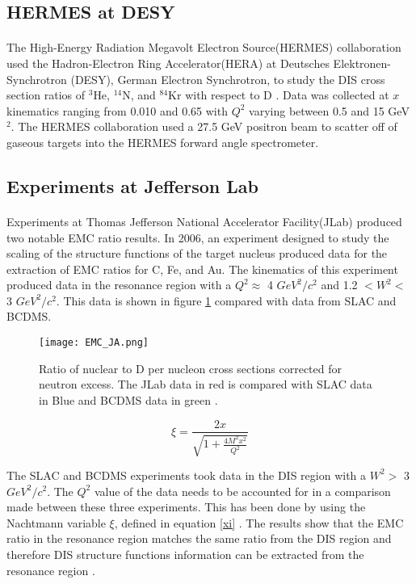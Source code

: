 \subsection{HERMES at DESY}
\paragraph{}
The High-Energy Radiation Megavolt Electron Source(HERMES) collaboration used the Hadron-Electron Ring Accelerator(HERA) at Deutsches Elektronen-Synchrotron (DESY), German Electron Synchrotron, to study the DIS cross section ratios of $^3$He, $^{14}$N, and $^{84}$Kr with respect to D \cite{HERMES_EMC}. Data was collected at $x$ kinematics ranging from 0.010 and 0.65 with $Q^2$ varying between 0.5 and 15 GeV$^2$\cite{HERMES_EMC}. The HERMES collaboration used a 27.5 GeV positron beam to scatter off of gaseous targets into the HERMES forward angle spectrometer. 
\subsection{Experiments at Jefferson Lab}
\paragraph{}Experiments at Thomas Jefferson National Accelerator Facility(JLab) produced two notable EMC ratio results. In 2006, an experiment designed to study the scaling of the structure functions of the target nucleus produced data for the extraction of EMC ratios for C, Fe, and Au. The kinematics of this experiment produced data in the resonance region with a $Q^2 \approx$ 4 $GeV^2/c^2$ and 1.2 $ < W^2 < $ 3 $GeV^2/c^2$. This data is shown in figure \ref{fig:EMCJA} compared with data from SLAC and BCDMS. 
\begin{figure}[]
	\centering
	\texttt{[image: EMC\_JA.png]} 
	\caption{Ratio of nuclear to D per nucleon cross sections corrected for neutron excess\cite{EMC_JA}. The JLab data in red is compared with SLAC data in Blue \cite{gomez} and BCDMS data in green \cite{BCDMS}.}
	\label{fig:EMCJA}
\end{figure} 
\begin{equation}
\xi = \frac{2x}{\sqrt{1 + \frac{4M^2x^2}{Q^2}}} \label{xi}
\end{equation}

The SLAC and BCDMS experiments took data in the DIS region with a $W^2 > $ 3 $GeV^2/c^2$. The $Q^2$ value of the data needs to be accounted for in a comparison made between these three experiments. This has been done by using the Nachtmann variable $\xi$, defined in equation \ref{xi} \cite{EMC_JA}. The results show that the EMC ratio in the resonance region matches the same ratio from the DIS region and therefore DIS structure functions information can be extracted from the resonance region \cite{seelyth}. 
